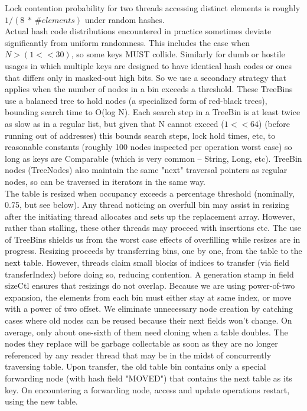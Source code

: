 \documentclass[UTF8,11pt]{ctexbook}
\begin{document}
	Lock contention probability for two threads accessing distinct
	elements is roughly $1 / (8\ *\ \#elements)$ under random hashes.\\
	
	Actual hash code distributions encountered in practice
	sometimes deviate significantly from uniform randomness.  This
	includes the case when $N > (1<<30)$, so some keys MUST collide.
	Similarly for dumb or hostile usages in which multiple keys are
	designed to have identical hash codes or ones that differs only
	in masked-out high bits. So we use a secondary strategy that
	applies when the number of nodes in a bin exceeds a
	threshold. These TreeBins use a balanced tree to hold nodes (a
	specialized form of red-black trees), bounding search time to
	O(log N).  Each search step in a TreeBin is at least twice as
	slow as in a regular list, but given that N cannot exceed
	($1<<64$) (before running out of addresses) this bounds search
	steps, lock hold times, etc, to reasonable constants (roughly
	100 nodes inspected per operation worst case) so long as keys
	are Comparable (which is very common -- String, Long, etc).
	TreeBin nodes (TreeNodes) also maintain the same "next"
	traversal pointers as regular nodes, so can be traversed in
	iterators in the same way.\\
	
	The table is resized when occupancy exceeds a percentage
	threshold (nominally, 0.75, but see below).  Any thread
	noticing an overfull bin may assist in resizing after the
	initiating thread allocates and sets up the replacement array.
	However, rather than stalling, these other threads may proceed
	with insertions etc.  The use of TreeBins shields us from the
	worst case effects of overfilling while resizes are in
	progress.  Resizing proceeds by transferring bins, one by one,
	from the table to the next table. However, threads claim small
	blocks of indices to transfer (via field transferIndex) before
	doing so, reducing contention.  A generation stamp in field
	sizeCtl ensures that resizings do not overlap. Because we are
	using power-of-two expansion, the elements from each bin must
	either stay at same index, or move with a power of two
	offset. We eliminate unnecessary node creation by catching
	cases where old nodes can be reused because their next fields
	won't change.  On average, only about one-sixth of them need
	cloning when a table doubles. The nodes they replace will be
	garbage collectable as soon as they are no longer referenced by
	any reader thread that may be in the midst of concurrently
	traversing table.  Upon transfer, the old table bin contains
	only a special forwarding node (with hash field "MOVED") that
	contains the next table as its key. On encountering a
	forwarding node, access and update operations restart, using
	the new table.\\
	
\end{document}
